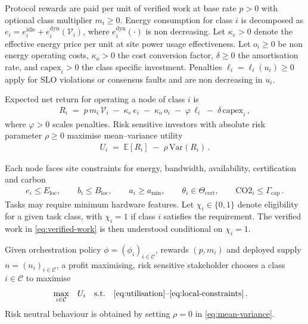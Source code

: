 \documentclass[oneside,10pt]{swissi}
\begin{document}
Protocol rewards are paid per unit of verified work at base rate \(p>0\) with optional class multiplier \(m_i\ge 0\). Energy consumption for class \(i\) is decomposed as \(e_i=e_i^{\mathrm{idle}}+e_i^{\mathrm{dyn}}(\mathcal{V}_i)\), where \(e_i^{\mathrm{dyn}}(\cdot)\) is non decreasing. Let \(\kappa_e>0\) denote the effective energy price per unit at site power usage effectiveness. Let \(o_i\ge 0\) be non energy operating costs, \(\kappa_o>0\) the cost conversion factor, \(\delta\ge 0\) the amortisation rate, and \(\mathrm{capex}_i>0\) the class specific investment. Penalties \(\ell_i=\ell_i(u_i)\ge 0\) apply for SLO violations or consensus faults and are non decreasing in \(u_i\).

Expected net return for operating a node of class \(i\) is
\begin{align}
R_i \;=\; p\,m_i\,\mathcal{V}_i \;-\; \kappa_e\,e_i \;-\; \kappa_o\,o_i \;-\; \varphi\,\ell_i \;-\; \delta\,\mathrm{capex}_i\,,
\label{eq:return}
\end{align}
where \(\varphi>0\) scales penalties. Risk sensitive investors with absolute risk parameter \(\rho\ge 0\) maximise mean–variance utility
\begin{align}
U_i \;=\; \mathbb{E}[R_i] \;-\; \rho\,\mathrm{Var}(R_i)\,.
\label{eq:mean-variance}
\end{align}

Each node faces site constraints for energy, bandwidth, availability, certification and carbon
\begin{align}
e_i \le E_{\mathrm{loc}},\qquad
b_i \le B_{\mathrm{loc}},\qquad
a_i \ge a_{\min},\qquad
\theta_i \in \Theta_{\mathrm{cert}},\qquad
\mathrm{CO2}_i \le \Gamma_{\mathrm{cap}}\,.
\label{eq:local-constraints}
\end{align}
Tasks may require minimum hardware features. Let \(\chi_i\in\{0,1\}\) denote eligibility for a given task class, with \(\chi_i=1\) if class \(i\) satisfies the requirement. The verified work in \eqref{eq:verified-work} is then understood conditional on \(\chi_i=1\).

Given orchestration policy \(\phi=(\phi_i)_{i\in\mathcal{C}}\), rewards \((p,m_i)\) and deployed supply \(n=(n_i)_{i\in\mathcal{C}}\), a profit maximising, risk sensitive stakeholder chooses a class \(i\in\mathcal{C}\) to maximise
\begin{align}
\max_{i\in\mathcal{C}}\quad & U_i \quad \text{s.t.}\quad \eqref{eq:utilisation}\text{--}\eqref{eq:local-constraints}\,.
\label{eq:investor-problem}
\end{align}
Risk neutral behaviour is obtained by setting \(\rho=0\) in \eqref{eq:mean-variance}.
\end{document}
